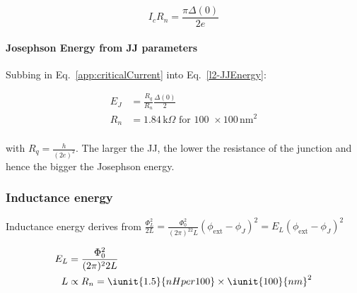    \begin{equation}\label{app:criticalCurrent}
     I_cR_n = \frac{\pi\Delta(0)}{2e}
   \end{equation}


   \begin{framed}\noindent
     \paragraph{Josephson    Energy   from    JJ   parameters}    Subbing   in    Eq.~\eqref{app:criticalCurrent}   into
     Eq.~\eqref{l2-JJEnergy}:

     \begin{equation}\label{key}
       \begin{aligned}
         E_J & = \frac{R_q}{R_n}\frac{\Delta(0)}{2}\\
         R_n & = 1.84\,\text{k}\Omega \text{ for 100 } \times 100\,\text{nm}^2\\
       \end{aligned}
     \end{equation}

     \noindent with $ R_q  = \frac{h}{(2e)^2} $. The larger the  JJ, the lower the resistance of  the junction and hence
     the bigger the Josephson energy.

   \end{framed}

   \subsubsection{Inductance energy}
   Inductance                              energy                              derives                              from
   $ \frac{\Phi_L^2}{2L} = \frac{\Phi_0^2}{(2\pi)^22L}(\phi_\text{ext}-\phi_J)^2 = E_L(\phi_\text{ext}-\phi_J)^2 $

   \begin{equation}
     \begin{aligned}
       E_L & = \frac{\Phi_0^2}{(2\pi)^22L}\\
       L & \propto R_n = \iunit{1.5}{nH per 100}\times\iunit{100}{nm}^2
     \end{aligned}
   \end{equation}

